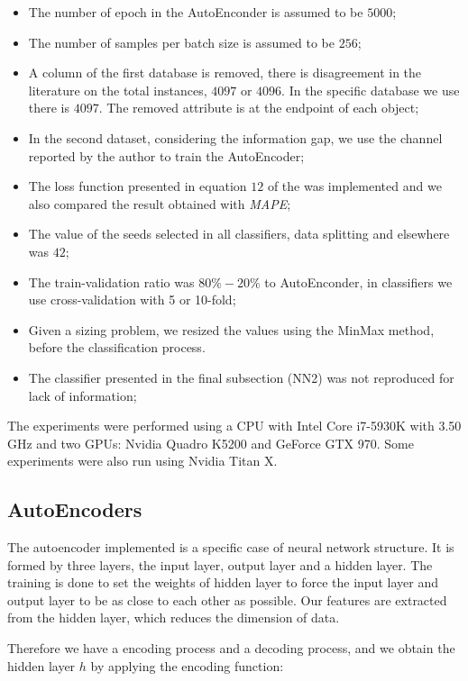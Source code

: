 \begin{itemize}
\item The number of epoch in the AutoEnconder is assumed to be $5000$; 
\item The number of samples per batch size is assumed to be $256$; 
\item A column of the first database is removed, there is disagreement in the literature on the total instances, $4097$ or $4096$. In the specific database we use there is $4097$. The removed attribute is at the endpoint of each object; 
\item In the second dataset, considering the information gap, we use the channel reported by the author to train the AutoEncoder;
\item The loss function presented in equation $12$ of the \cite{WenZha:2018} was implemented and we also compared the result obtained with \textit{MAPE}; 
\item The value of the seeds selected in all classifiers, data splitting and elsewhere was $42$; 
\item The train-validation ratio was $80\%-20\%$ to AutoEnconder, in classifiers we use cross-validation with 5 or 10-fold; 
\item Given a sizing problem, we resized the values using the MinMax method, before the classification process.
\item The classifier presented in the final subsection (NN2) was not reproduced for lack of information; 
\end{itemize}

The experiments were performed using a CPU with Intel Core i7-5930K with 3.50 GHz and two GPUs: Nvidia Quadro K5200 and GeForce GTX 970. Some experiments were also run using Nvidia Titan X.

\subsection{AutoEncoders}

The autoencoder implemented is a specific case of neural network structure. It is formed by three layers, the input layer, output layer and a hidden layer. The training is done to set the weights of hidden layer to force the input layer and output layer to be as close to each other as possible. Our features are extracted from the hidden layer, which reduces the dimension of data. 

Therefore we have a encoding process and a decoding process, and we obtain the hidden layer $h$ by applying the encoding function:

